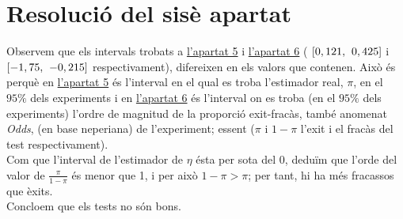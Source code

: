 \documentclass[12pt]{article}
\begin{document}
\section{Resolució del sisè apartat}
Observem que els intervals trobats a \href{se}{\textcolor{blue(ncs)}{l'apartat 5}} i \href{se}{\textcolor{blue(ncs)}{l'apartat 6}} ( $ \left[ 0,121, \hspace{0.4em} 0,425 \right]$ i $\left[ -1,75, \hspace{0.4em} -0,215 \right]$ respectivament), difereixen en els valors que contenen. Això és perquè en \href{se}{\textcolor{blue(ncs)}{l'apartat 5}} és l'interval en el qual es troba l'estimador real, $\pi$, en el $95\%$ dels experiments i en \href{se}{\textcolor{blue(ncs)}{l'apartat 6}} és l'interval on es troba (en el $95\%$ dels experiments) l'ordre de magnitud de la proporció exit-fracàs, també anomenat \textit{Odds}, (en base neperiana) de l'experiment; essent ($\pi$ i $1-\pi$ l'exit i el fracàs del test respectivament).\\
Com que l'interval de l'estimador de $\eta$ ésta per sota del 0, deduïm que l'orde del valor de $\frac{\pi}{1-\pi}$ és menor que 1, i per això $1-\pi > \pi$; per tant, hi ha més fracassos que èxits.\\
Concloem que els tests no són bons.
\end{document}
